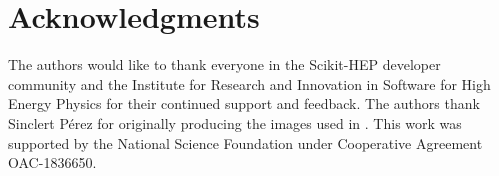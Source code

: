\section{Acknowledgments}\label{sec:acknowledgements}

The authors would like to thank everyone in the Scikit-HEP developer community and the Institute for Research and Innovation in Software for High Energy Physics for their continued support and feedback.
The authors thank Sinclert P{\'e}rez for originally producing the images used in .
This work was supported by the National Science Foundation under Cooperative Agreement OAC-1836650.
